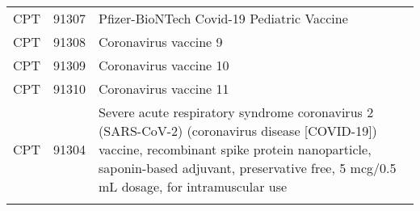 \begin{longtable}{p{}p{}p{}}
  CPT & 91307 & Pfizer-BioNTech Covid-19 Pediatric Vaccine \\ 
  CPT & 91308 & Coronavirus vaccine 9 \\ 
  CPT & 91309 & Coronavirus vaccine 10 \\ 
  CPT & 91310 & Coronavirus vaccine 11 \\ 
  CPT & 91304 & Severe acute respiratory syndrome coronavirus 2 (SARS-CoV-2) (coronavirus disease [COVID-19]) vaccine, recombinant spike protein nanoparticle, saponin-based adjuvant, preservative free, 5 mcg/0.5 mL dosage, for intramuscular use \\ 
  \hline
\label{tab:codes_covid_vaccine}
\end{longtable}
